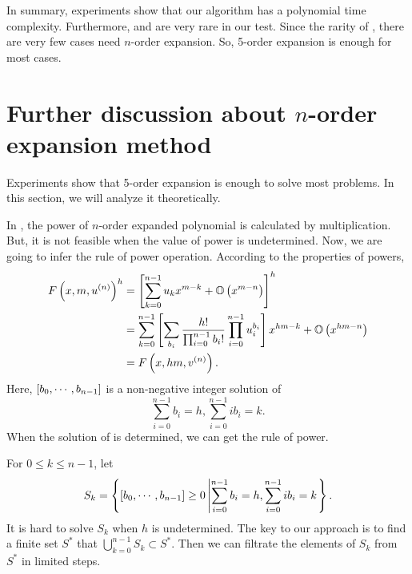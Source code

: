 In summary, experiments show that our algorithm has a polynomial time complexity. Furthermore, \BPtwo{} and \BPthree{} are very rare in our test. Since the rarity of \BPthree{}, there are very few cases need $n$-order expansion. So, 5-order expansion is enough for most cases.

\section{Further discussion about $n$-order expansion method} \label{$n$-order-discussion-02}

Experiments show that 5-order expansion is enough to solve most problems. In this section, we will analyze it theoretically.

In , the power of $n$-order expanded polynomial is calculated by multiplication. But, it is not feasible when the value of power is undetermined. Now, we are going to infer the rule of power operation. According to the properties of powers,
\begin{equation}
\begin{split}
F\left(x,m,u^{(n)}\right)^h &= \left[\sum_{k=0}^{n-1}{u_kx^{m-k}}+\mathbb O\left(x^{m-n}\right)\right]^h \\
&= \sum_{k=0}^{n-1}{\left[\sum_{b_i}{\frac{h!}{\prod_{i=0}^{n-1}{b_i !}}\prod_{i=0}^{n-1}{u_i^{b_i}}}\right]x^{hm-k}}+\mathbb O\left(x^{hm-n}\right) \\
&= F\left(x,hm,v^{(n)}\right).
\end{split}
\label{power}
\end{equation}
Here, $\left[b_0,\cdots,b_{n-1}\right]$ is a non-negative integer solution of
\begin{equation}
\sum_{i=0}^{n-1}{b_i}=h,\sum_{i=0}^{n-1}{ib_i}=k \label{bi}.
\end{equation}
When the solution of  is determined, we can get the rule of power.

For $0\le k \le n-1$, let
\begin{equation}
S_k=\left\{\left[b_0,\cdots,b_{n-1}\right]\ge 0 \left| \sum_{i=0}^{n-1}{b_i}=h,\sum_{i=0}^{n-1}{ib_i}=k \right.\right\}.
\end{equation}
It is hard to solve $S_k$ when $h$ is undetermined. The key to our approach is to find a finite set $S^*$ that $\bigcup\nolimits_{k=0}^{n-1}S_k\subset S^*$. Then we can filtrate the elements of $S_k$ from $S^*$ in limited steps.


